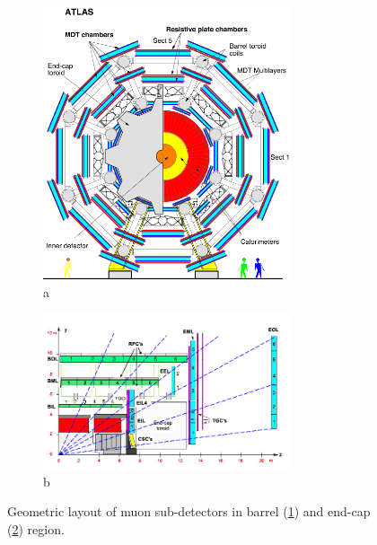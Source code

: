 \begin{figure}[htbp!]
\begin{subfigure}{.5\textwidth}
    \centering
    \includegraphics[width=0.8\textwidth]{chapters/c4/figures/mu-bar}
    \caption{a}
    \label{fig:mu-bar}
\end{subfigure}%
\begin{subfigure}{.5\textwidth}
    \centering
    \includegraphics[width=0.8\textwidth]{chapters/c4/figures/mu-end}
    \caption{b}
    \label{fig:mu-end}
\end{subfigure}
\caption{Geometric layout of muon sub-detectors in barrel (\ref{fig:mu-bar}) and end-cap (\ref{fig:mu-end}) region.}
\label{fig:mu}
\end{figure}

